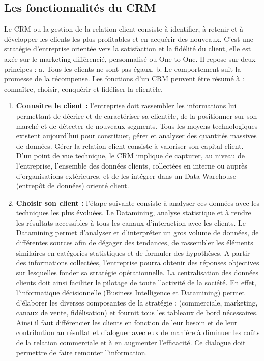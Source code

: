 \documentclass[a4paper, 12pt]{report}
\begin{document}
\begin{itemize}
\subsection{Les fonctionnalités du CRM }
Le CRM ou la gestion de la relation client consiste à identifier, à retenir et à développer les clients les plus profitables et en acquérir des nouveaux. C'est une stratégie d'entreprise orientée vers la satisfaction et la fidélité du client, elle est axée sur le marketing différencié, personnalisé ou One to One. Il repose sur deux principes : 
a.	Tous les clients ne sont pas égaux. 
b.	Le comportement suit la promesse de la récompense. 
Les fonctions d'un CRM peuvent être résumé à : connaître, choisir, conquérir et fidéliser la clientèle.  
  
\begin{enumerate}
	\item 
	\textbf{Connaître le client :} l'entreprise doit rassembler les informations lui permettant de décrire et de caractériser sa clientèle, de la positionner sur son marché et de détecter de nouveaux segments. 
Tous les moyens technologiques existent aujourd'hui pour constituer, gérer et analyser des quantités massives de données. Gérer la relation client consiste à valoriser son capital client. D'un point de vue technique, le CRM implique de capturer, au niveau de l'entreprise, l'ensemble des données clients, collectées en interne ou auprès d'organisations extérieures, et de les intégrer dans un Data Warehouse (entrepôt de données) orienté client. 
\item	\textbf{Choisir son client :} l'étape suivante consiste à analyser ces données avec les techniques les plus évoluées. Le Datamining, analyse statistique et à rendre les résultats accessibles à tous les canaux d'interaction avec les clients. Le Datamining permet d'analyser et d'interpréter un gros volume de données, de différentes sources afin de dégager des tendances, de rassembler les éléments similaires en catégories statistiques et de formuler des hypothèses. A partir des informations collectées, l'entreprise pourra obtenir des réponses objectives sur lesquelles fonder sa stratégie opérationnelle. La centralisation des données clients doit ainsi faciliter le pilotage de toute l'activité de la société. En effet, l'informatique décisionnelle (Business Intelligence et Datamining) permet d'élaborer les diverses composantes de la stratégie : (commerciale, marketing, canaux de vente, fidélisation) et fournit tous les tableaux de bord nécessaires. Ainsi il faut différencier les clients en fonction de leur besoin et de leur contribution au résultat et dialoguer avec eux de manière à diminuer les coûts de la relation commerciale et à en augmenter l'efficacité. Ce dialogue doit permettre de faire remonter l'information. 

\end{enumerate}
\end{itemize}
\end{document}
